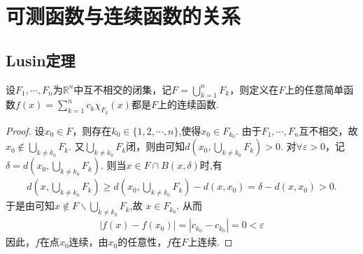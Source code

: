 \documentclass[../../main.tex]{subfiles}
\begin{document}
\section{可测函数与连续函数的关系}

\subsection{Lusin定理}

\begin{lemma}\label{lemma:简单函数在无交闭集连续则在这些闭集的并上也连续}
设\(F_1, \cdots, F_n\)为\(\mathbb{R}^n\)中互不相交的闭集，记\(F = \bigcup_{k = 1}^{n} F_k\)，则定义在$F$上的任意简单函数\(f(x) = \sum_{k = 1}^{n} c_k \chi_{F_k}(x)\)都是\(F\)上的连续函数.
\end{lemma}
\begin{proof}
设\(x_0 \in F\)，则存在\(k_0\in \{1,2,\cdots,n\}\),使得\(x_0 \in F_{k_0}\). 由于\(F_1, \cdots, F_n\)互不相交，故\(x_0 \notin \bigcup_{k \neq k_0} F_k\). 又\(\bigcup_{k \neq k_0} F_k\)闭，则由可知\(d(x_0, \bigcup_{k \neq k_0} F_k) > 0\). 对\(\forall \varepsilon > 0\)，记\(\delta = d(x_0, \bigcup_{k \neq k_0} F_k)\). 则当\(x \in F\cap B(x,\delta)\)时,有
\begin{align*}
d\left( x,\bigcup_{k\ne k_0}{F_k} \right) \geqslant d\left( x_0,\bigcup_{k\ne k_0}{F_k} \right) -d\left( x,x_0 \right) =\delta -d\left( x,x_0 \right) >0.
\end{align*}
于是由可知$x\notin F\backslash \bigcup_{k\ne k_0}{F_k}$,故
\(x \in F_{k_0}\). 从而
\begin{align*}
|f(x) - f(x_0)| = |c_{k_0} - c_{k_0}| = 0 < \varepsilon
\end{align*}
因此，\(f\)在点\(x_0\)连续，由\(x_0\)的任意性，\(f\)在\(F\)上连续. 

\end{proof}
\end{document}
